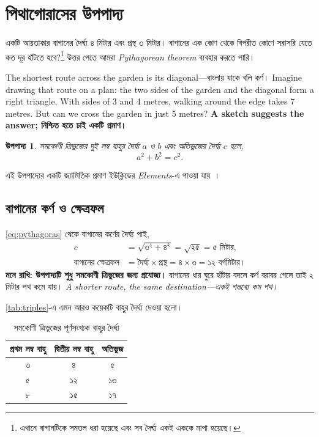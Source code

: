 \documentclass[11pt,a4paper]{article}
\newtheorem{theorem}{উপপাদ্য}[section]
\begin{document}
\section{পিথাগোরাসের উপপাদ্য}
একটি আয়তাকার বাগানের দৈর্ঘ্য ৪ মিটার এবং প্রস্থ ৩ মিটার। বাগানের এক কোণ
থেকে বিপরীত কোণে সরাসরি যেতে কত দূর হাঁটতে হবে?\footnote{এখানে বাগানটিকে
সমতল ধরা হয়েছে এবং সব দৈর্ঘ্য একই এককে মাপা হয়েছে।}
উত্তর পেতে আমরা \textit{Pythagorean theorem} ব্যবহার করতে পারি।

The shortest route across the garden is its diagonal—বাংলায় যাকে বলি কর্ণ।
Imagine drawing that route on a plan: the two sides of the garden and the
diagonal form a right triangle. With sides of 3 and 4 metres, walking around
the edge takes 7 metres. But can we cross the garden in just 5 metres?
\textbf{A sketch suggests the answer; নিশ্চিত হতে চাই একটি প্রমাণ।}

\begin{theorem}
সমকোণী ত্রিভুজের দুই লম্ব বাহুর দৈর্ঘ্য $a$ ও $b$ এবং অতিভুজের দৈর্ঘ্য $c$ হলে,
\begin{equation}\label{eq:pythagoras}
  a^2+b^2=c^2.
\end{equation}
\end{theorem}
এই উপপাদ্যের একটি জ্যামিতিক প্রমাণ ইউক্লিডের \textit{Elements}-এ পাওয়া যায়~\cite{euclid}।

\subsection{বাগানের কর্ণ ও ক্ষেত্রফল}
\eqref{eq:pythagoras} থেকে বাগানের কর্ণের দৈর্ঘ্য পাই,
\begin{align*}
  c &= \sqrt{৩^{২}+৪^{২}}=\sqrt{২৫}=৫\text{ মিটার},\\
  \text{বাগানের ক্ষেত্রফল} &= \text{দৈর্ঘ্য}\times\text{প্রস্থ}
    =৪\times৩=১২\text{ বর্গমিটার।}
\end{align*}
\textbf{মনে রাখি: উপপাদ্যটি শুধু সমকোণী ত্রিভুজের জন্য প্রযোজ্য।}
বাগানের ধার ঘুরে হাঁটার বদলে কর্ণ বরাবর গেলে তাই ২ মিটার পথ কমে যায়।
\textit{A shorter route, the same destination—একই গন্তব্যে কম পথ।}

\autoref{tab:triples}-এ এমন আরও কয়েকটি বাহুর দৈর্ঘ্য দেওয়া হলো।
\begin{table}[ht]
  \centering
  \caption{সমকোণী ত্রিভুজের পূর্ণসংখ্যক বাহুর দৈর্ঘ্য}\label{tab:triples}
  \begin{tabular}{ccc}
    \hline
    প্রথম লম্ব বাহু & দ্বিতীয় লম্ব বাহু & অতিভুজ \\
    \hline
    ৩ & ৪ & ৫ \\
    ৫ & ১২ & ১৩ \\
    ৮ & ১৫ & ১৭ \\
    \hline
  \end{tabular}
\end{table}
\end{document}
